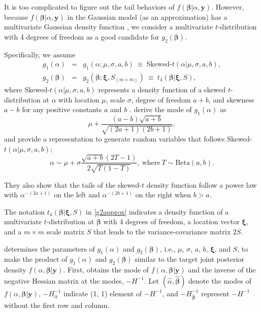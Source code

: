 \documentclass[article]{jss}
\begin{document}
It is too complicated to figure out the tail behaviors of $f(\boldsymbol{\beta} \vert \alpha,  \boldsymbol{y})$. However, because $f(\boldsymbol{\beta} \vert \alpha,  \boldsymbol{y})$ in the Gaussian  model (as an approximation) has a multivariate Gaussian density function \citep{tang2011, kelly2014advances}, we consider a multivariate $t$-distribution with 4  degrees of freedom as a good candidate for $g_2(\boldsymbol{\beta})$.


Specifically, we assume
\begin{eqnarray}\label{env}
g_1(\alpha) &=& g_1(\alpha; \mu, \sigma, a, b)~\equiv~\textrm{Skewed-}t(\alpha\vert\mu, \sigma, a, b),\\
g_2(\boldsymbol{\beta}) &=& g_2(\boldsymbol{\beta}; \boldsymbol{\xi}, S_{(m\times m)})~\equiv~t_{4}(\boldsymbol{\beta}\vert \boldsymbol{\xi}, S),\label{g2approx}
\end{eqnarray}
where Skewed-$t(\alpha\vert\mu, \sigma, a, b)$ represents a density function of a skewed $t$-distribution  at $\alpha$ with location $\mu$, scale $\sigma$, degree of freedom $a+b$, and skewness $a-b$ for any positive constants $a$ and $b$ \citep{jones2003skew}. \cite{jones2003skew} derive the mode of $g_1(\alpha)$ as
\begin{equation}\label{mode}
\mu+\frac{(a-b)\sqrt{a+b}}{\sqrt{(2a+1)(2b+1)}},
\end{equation} 
and provide a  representation to generate  random variables that follows Skewed-$t(\alpha\vert\mu, \sigma, a, b)$;
\begin{equation}
\alpha\sim \mu+\sigma\frac{\sqrt{a+b}(2T-1)}{2\sqrt{T(1-T)}}, ~\textrm{where}~ T\sim \textrm{Beta}(a, b).
\end{equation}

They also show that the tails of the skewed-$t$ density function  follow a power law with $\alpha^{-(2a+1)}$ on the left and $\alpha^{-(2b+1)}$ on the right when $b>a$. 

The notation $t_{4}(\boldsymbol{\beta}\vert\boldsymbol{\xi}, S)$ in  \eqref{g2approx} indicates a density function of a multivariate $t$-distribution at $\boldsymbol{\beta}$ with 4 degrees of freedom, a location vector $\boldsymbol{\xi}$, and a $m\times m$ scale matrix $S$ that leads to the variance-covariance matrix $2S$. 

 determines the parameters of $g_1(\alpha)$ and $g_2(\boldsymbol{\beta})$, i.e., $\mu$, $\sigma$, $a$, $b$, $\boldsymbol{\xi}$, and $S$, to make the product of $g_1(\alpha)$ and $g_2(\boldsymbol{\beta})$ similar to the target joint posterior density $f(\alpha, \boldsymbol{\beta} \vert  \boldsymbol{y})$. First,  obtains the  mode of $f(\alpha, \boldsymbol{\beta} \vert  \boldsymbol{y})$ and the inverse of the  negative Hessian matrix at the modes, $-H^{-1}$. Let $(\hat{\alpha}, \hat{\boldsymbol{\beta}})$ denote the modes of $f(\alpha, \boldsymbol{\beta} \vert  \boldsymbol{y})$, $-H^{-1}_{\hat{\alpha}}$ indicate (1, 1) element of $-H^{-1}$, and $-H^{-1}_{\hat{\boldsymbol{\beta}}}$ represent  $-H^{-1}$ without the first row and  column.  
\end{document}
